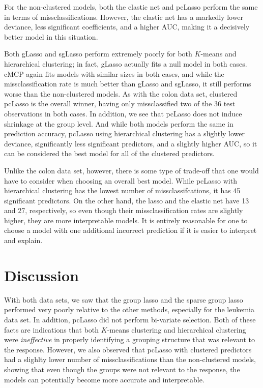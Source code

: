 \documentclass[11pt]{article}
\begin{document}
For the non-clustered models, both the elastic net and pcLasso perform the same in terms of missclassifications. However, the elastic net has a markedly lower deviance, less significant coefficients, and a higher AUC, making it a decisively better model in this situation. 

Both gLasso and sgLasso perform extremely poorly for both $K$-means and hierarchical clustering; in fact, gLasso actually fits a null model in both cases. cMCP again fits models with similar sizes in both cases, and while the missclassification rate is much better than gLasso and sgLasso, it still performs worse than the non-clustered models. As with the colon data set, clustered pcLasso is the overall winner, having only missclassified two of the 36 test observations in both cases. In addition, we see that pcLasso does not induce shrinkage at the group level. And while both models perform the same in prediction accuracy, pcLasso using hierarchical clustering has a slightly lower deviance, significantly less significant predictors, and a slightly higher AUC, so it can be considered the best model for all of the clustered predictors. 

Unlike the colon data set, however, there is some type of trade-off that one would have to consider when choosing an overall best model. While pcLasso with hierarchical clustering has the lowest number of missclassifcations, it has 45 significant predictors. On the other hand, the lasso and the elastic net have 13 and 27, respectively, so even though their missclassification rates are slightly higher, they are more interpretable models. It is entirely reasonable for one to choose a model with one additional incorrect prediction if it is easier to interpret and explain. 

\section{Discussion}

With both data sets, we saw that the group lasso and the sparse group lasso performed very poorly relative to the other methods, especially for the leukemia data set. In addition, pcLasso did not perform bi-variate selection. Both of these facts are indications that both $K$-means clustering and hierarchical clustering were \textit{ineffective} in properly identifying a grouping structure that was relevant to the response. However, we also observed that pcLasso with clustered predictors had a slighlty lower number of missclassifications than the non-clustered models, showing that even though the groups were not relevant to the response, the models can potentially become more accurate and interpretable. 
\end{document}
